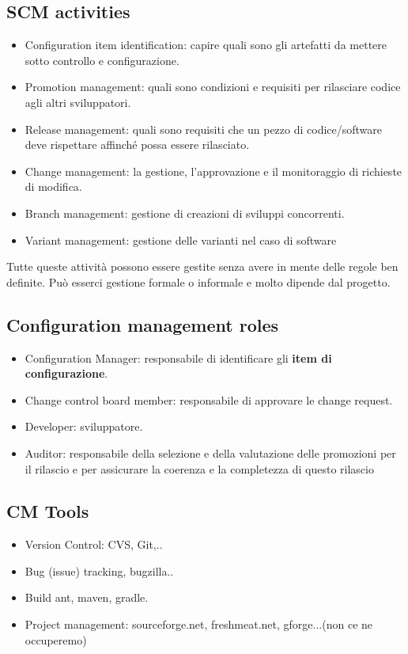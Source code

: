 \documentclass[10pt,a4paper]{book}
\begin{document}
\subsection{SCM activities}
\begin{itemize}
\item Configuration item identification: capire quali sono gli artefatti da mettere sotto controllo e configurazione.
\item Promotion management: quali sono condizioni e requisiti per rilasciare codice agli altri sviluppatori.
\item Release management: quali sono requisiti che un pezzo di codice/software deve rispettare affinché possa essere rilasciato.
\item Change management: la gestione, l'approvazione e il monitoraggio di richieste di modifica.
\item Branch management: gestione di creazioni di sviluppi concorrenti.
\item Variant management: gestione delle varianti nel caso di software
\end{itemize}

Tutte queste attività possono essere gestite senza avere in mente delle regole ben definite. Può esserci gestione formale o informale e molto dipende dal progetto.

\subsection{Configuration management roles}
\begin{itemize}
\item Configuration Manager: responsabile di identificare gli \textbf{item di configurazione}.
\item Change control board member: responsabile di approvare le change request.
\item Developer: sviluppatore.
\item Auditor: responsabile della selezione e della valutazione delle promozioni per il rilascio e per assicurare la coerenza e la completezza di questo rilascio
\end{itemize}


\subsection{CM Tools}
\begin{itemize}
\item Version Control: CVS, Git,..
\item Bug (issue) tracking, bugzilla..
\item Build ant, maven, gradle.
\item Project management: sourceforge.net, freshmeat.net, gforge...(non ce ne occuperemo)

\end{itemize}
\end{document}
